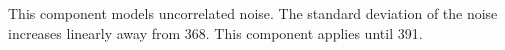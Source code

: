 This component models uncorrelated noise.
The standard deviation of the noise increases linearly away from  368.
This component applies until  391.